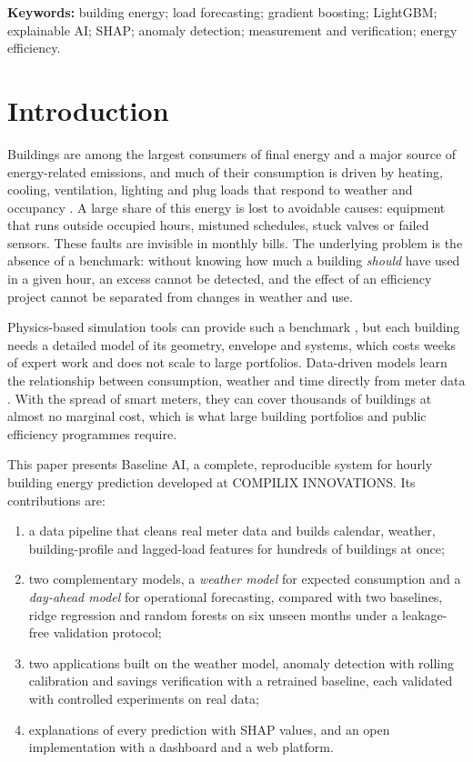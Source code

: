 \documentclass[11pt,a4paper]{article}
\begin{document}
\noindent\textbf{Keywords:} building energy; load forecasting; gradient boosting; LightGBM; explainable AI; SHAP;
anomaly detection; measurement and verification; energy efficiency.

\section{Introduction}

Buildings are among the largest consumers of final energy and a major source of energy-related emissions, and much
of their consumption is driven by heating, cooling, ventilation, lighting and plug loads that respond to weather and
occupancy \citep{amasyali2018review}. A large share of this energy is lost to avoidable causes: equipment that runs
outside occupied hours, mistuned schedules, stuck valves or failed sensors. These faults are invisible in monthly
bills. The underlying problem is the absence of a benchmark: without knowing how much a building \emph{should} have
used in a given hour, an excess cannot be detected, and the effect of an efficiency project cannot be separated from
changes in weather and use.

Physics-based simulation tools can provide such a benchmark \citep{crawley2001energyplus}, but each building needs a
detailed model of its geometry, envelope and systems, which costs weeks of expert work and does not scale to large
portfolios. Data-driven models learn the relationship between consumption, weather and time directly from meter
data \citep{amasyali2018review}. With the spread of smart meters, they can cover thousands of buildings at almost no
marginal cost, which is what large building portfolios and public efficiency programmes require.

This paper presents Baseline AI, a complete, reproducible system for hourly building energy prediction developed at
COMPILIX INNOVATIONS. Its contributions are:
\begin{enumerate}[leftmargin=1.4em]
  \item a data pipeline that cleans real meter data and builds calendar, weather, building-profile and lagged-load
        features for hundreds of buildings at once;
  \item two complementary models, a \emph{weather model} for expected consumption and a \emph{day-ahead model} for
        operational forecasting, compared with two baselines, ridge regression and random forests on six unseen
        months under a leakage-free validation protocol;
  \item two applications built on the weather model, anomaly detection with rolling calibration and savings
        verification with a retrained baseline, each validated with controlled experiments on real data;
  \item explanations of every prediction with SHAP values, and an open implementation with a dashboard and a web
        platform.
\end{enumerate}
\end{document}
